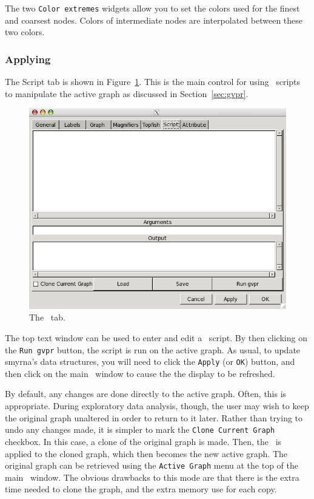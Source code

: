 The two {\tt Color extremes} widgets allow you to set the colors used for the finest
and coarsest nodes. Colors of intermediate nodes are interpolated between these two colors.

\subsubsection{Applying \gvpr}
\label{sec:gvprtab}
The Script tab is shown in Figure~\ref{fig:gvpr}.
This is the main control for using \gvpr\ scripts to manipulate the active graph
as discussed in Section~\ref{sec:gvpr}.
\begin{figure}[ht]
\begin{center}
\includegraphics[scale=.5]{figures/gvpr.png}
\caption{\small The \gvpr\ tab.}
\label{fig:gvpr}
\end{center}
\end{figure}
The top text window can be used to enter and edit a \gvpr\ script. By then clicking on 
the {\tt Run gvpr} button, the script is run on the active graph. As usual, to update
smyrna's data structures, you will need to click the {\tt Apply} (or {\tt OK}) button,
and then click on the main \smyrna\ window to cause the the display to be refreshed. 

By default, any changes are done directly to the active graph. Often, this is appropriate.
During exploratory data analysis, though, the user may wish to keep the original graph unaltered
in order to return to it later. Rather than trying to undo any changes made, it is simpler to
mark the {\tt Clone Current Graph} checkbox. In this case, a clone of the original graph is made.
Then, the \gvpr\ is applied to the cloned graph, which then becomes the new active graph. The
original graph can be retrieved using the {\tt Active Graph} menu at the top of the main
\smyrna\ window. The obvious drawbacks to this mode are that there is the extra time needed to
clone the graph, and the extra memory use for each copy.

